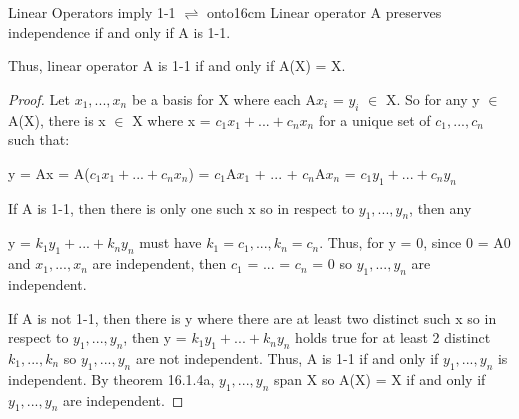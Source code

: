     \vspace{0.5cm}



    \begin{wtheorem}{Linear Operators imply 1-1 $\rightleftharpoons$ onto}{16cm}
        Linear operator A preserves independence if and only if A is 1-1.

        Thus, linear operator A is 1-1 if and only if A(X) = X.
    \end{wtheorem}

    \begin{proof}
        Let $x_1,...,x_n$ be a basis for X where each A$x_i$ = $y_i$ $\in$ X.
        So for any y $\in$ A(X), there is x $\in$ X where
        x = $c_1x_1 + ... + c_nx_n$ for a unique set of $c_1,...,c_n$
        such that:

        \hspace{0.5cm}
        y = Ax = A($c_1x_1 + ... + c_nx_n$)
        = $c_1$A$x_1$ + ... + $c_n$A$x_n$
        = $c_1y_1 + ... + c_ny_n$

        If A is 1-1, then there is only one such x so
        in respect to $y_1,...,y_n$, then any

        y = $k_1y_1 + ... + k_ny_n$
        must have $k_1 = c_1, ... , k_n = c_n$.
        Thus, for y = 0, since 0 = A0 and $x_1,...,x_n$ are independent,
        then $c_1$ = ... = $c_n$ = 0 so $y_1,...,y_n$ are independent.
        
        If A is not 1-1, then there is y where there are at least two distinct
        such x so in respect to $y_1,...,y_n$, then y = $k_1y_1 + ... + k_ny_n$
        holds true for at least 2 distinct $k_1,...,k_n$ so
        $y_1,...,y_n$ are not independent.
        Thus, A is 1-1 if and only if $y_1,...,y_n$ is independent.
        By {\color{red} theorem 16.1.4a}, $y_1,...,y_n$ span X
        so A(X) = X if and only if $y_1,...,y_n$ are independent.
    \end{proof}

    \vspace{0.5cm}



